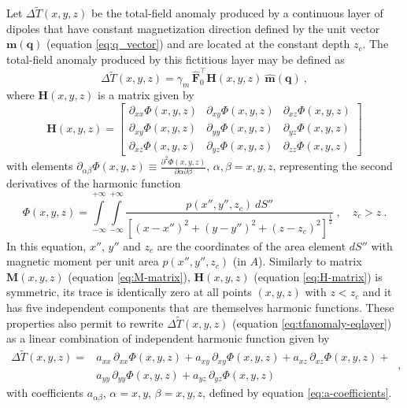 Let $\Delta \tilde{T}(x, y, z)$ be the total-field anomaly produced by a 
continuous layer of dipoles that have constant magnetization direction defined by
the unit vector $\mathbf{m}(\mathbf{q})$ (equation \ref{eq:q_vector})
and are located at the constant depth $z_{c}$. The total-field anomaly produced
by this fictitious layer may be defined as
\begin{equation}
\Delta \tilde{T}(x, y, z) = \gamma_{m} \, \hat{\mathbf{F}}_{0}^{\top} \mathbf{H}(x, y, z) \: 
\hat{\mathbf{m}}(\mathbf{q}) \: ,
\label{eq:tfanomaly-eqlayer}
\end{equation}
where $\mathbf{H}(x, y, z)$ is a matrix given by
\begin{equation}
	\mathbf{H}(x, y, z) = \begin{bmatrix}
		\partial_{xx} \Phi(x, y, z) & 
		\partial_{xy} \Phi(x, y, z) &
		\partial_{xz} \Phi(x, y, z) \\
		\partial_{xy} \Phi(x, y, z) & 
		\partial_{yy} \Phi(x, y, z) &
		\partial_{yz} \Phi(x, y, z) \\
		\partial_{xz} \Phi(x, y, z) & 
		\partial_{yz} \Phi(x, y, z) &
		\partial_{zz} \Phi(x, y, z)
	\end{bmatrix}
	\label{eq:H-matrix}
\end{equation}
with elements
$\partial_{\alpha\beta} \Phi(x, y, z) \equiv 
\frac{\partial^{2} \Phi(x, y, z)}{\partial \alpha \partial \beta}$, 
$\alpha, \beta = x, y, z$, representing the second derivatives of the harmonic
function
\begin{equation}
	\Phi(x, y, z) = \int\limits_{-\infty}^{+\infty}\int\limits_{-\infty}^{+\infty}
	\frac{p(x'', y'', z_{c}) \: dS''}
	{\left[ (x-x'')^2 + (y-y'')^2 + (z-z_{c})^2 \right]^{\frac{1}{2}}} \: ,
	\quad z_{c} > z \: .
	\label{eq:Phi-surface-integral}
\end{equation}
In this equation, $x''$, $y''$ and $z_{c}$ are the coordinates 
of the area element $dS''$ with magnetic moment per unit area
$p(x'', y'', z_{c})$ (in $A$).
Similarly to matrix $\mathbf{M}(x, y, z)$ (equation \ref{eq:M-matrix}),
$\mathbf{H}(x, y, z)$ (equation \ref{eq:H-matrix}) is symmetric,
its trace is identically zero at all points $(x, y, z)$ with $z < z_{c}$ 
and it has five independent components that are themselves harmonic functions. 
These properties also permit to rewrite $\Delta \tilde{T}(x, y, z)$ 
(equation \ref{eq:tfanomaly-eqlayer}) as a linear combination of independent
harmonic function given by
\begin{equation}
\begin{split}
\Delta \tilde{T}(x, y, z) = 
&a_{xx} \, \partial_{xx} \Phi(x, y, z) + 
a_{xy} \, \partial_{xy} \Phi(x, y, z) + 
a_{xz} \, \partial_{xz} \Phi(x, y, z) + \\
&a_{yy} \, \partial_{yy} \Phi(x, y, z) + 
a_{yz} \, \partial_{yz} \Phi(x, y, z)
\end{split} \: ,
\label{eq:tfanomaly-eqlayer-alternative}
\end{equation}
with coefficients $a_{\alpha\beta}$, $\alpha = x, y$, $\beta = x, y, z$, defined by
equation \ref{eq:a-coefficients}.

